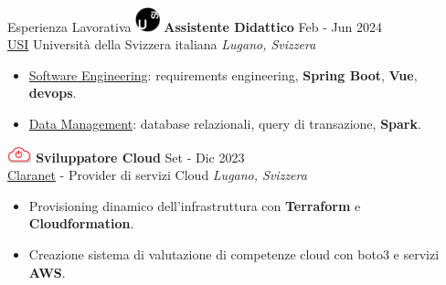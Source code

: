 \documentclass{cv} %
\def\intraexpvspace{0.15cm}
\begin{document}
\begin{minipage}[b][0.9\paperheight][t]{0.7\linewidth}
\begin{rSection}{Esperienza Lavorativa}
        \includegraphics[width=0.7cm, trim={0cm 10cm 0cm 0cm}]{usi-icon.png}
        \hspace*{0cm}\textbf{Assistente Didattico} \hfill Feb - Jun 2024\\
        \hspace*{0.85cm}\href{https://www.usi.ch/}{USI} Università della Svizzera italiana
        \hfill \textit{Lugano, Svizzera}
        \begin{itemize}
            \item \href{https://search.usi.ch/it/corsi/35268192/software-atelier-4-software-engineering-project}{Software Engineering}:
                  requirements engineering, \textbf{Spring Boot}, \textbf{Vue}, \textbf{devops}.

            \item \href{https://search.usi.ch/it/corsi/35268184/data-management}{Data Management}:
                  database relazionali, query di transazione, \textbf{Spark}.
        \end{itemize}
        \vspace{\intraexpvspace}
        \vspace{\intraexpvspace}

        \includegraphics[width=0.7cm, trim={0cm 15cm 0cm 0cm}]{claranet-logo.png}
        \textbf{Sviluppatore Cloud} \hfill Set - Dic 2023\\
        \hspace*{0.85cm}\href{https://www.claranet.com/}{Claranet} - Provider di servizi Cloud
        \hfill \textit{Lugano, Svizzera}
        \begin{itemize}
            \item Provisioning dinamico dell'infrastruttura con \textbf{Terraform} e \textbf{Cloudformation}.

            \item Creazione sistema di valutazione di competenze cloud con boto3 e servizi \textbf{AWS}.
        \end{itemize}
        \vspace{\intraexpvspace}
        \vspace{\intraexpvspace}


\end{rSection}
\end{minipage}
\end{document}
